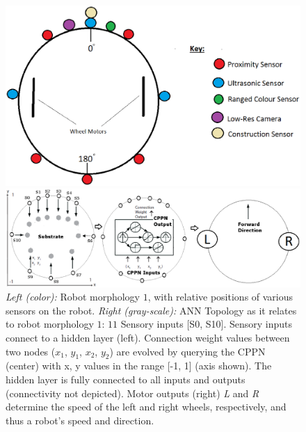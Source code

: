\documentclass[conference]{IEEEtran}
\begin{document}
\begin{figure}[t]
    \centering
    \begin{minipage}{0.39\textwidth}
       	\centering
        \includegraphics[width=\textwidth]{Morphology.eps}
    \end{minipage}
    \centering
    \begin{minipage}{0.60\textwidth}
       	\centering
        \includegraphics[width=\textwidth]{ANN_Config3.eps}
    \end{minipage}
    \caption{\textit{Left (color):} Robot morphology $1$, with relative positions of various sensors on the robot.
    \textit{Right (gray-scale):} ANN Topology as it relates to robot morphology $1$: $11$ Sensory inputs [S0, S10].  Sensory inputs connect to a hidden
    layer (left).  Connection weight values between two nodes ($x_{1}$, $y_{1}$, $x_{2}$, $y_{2}$) are evolved by querying the CPPN (center) with x, y
    values in the range [-1, 1] (axis shown).  The hidden layer is fully connected to all inputs and outputs (connectivity not depicted).
    Motor outputs (right)
    \textit{L} and \textit{R} determine the speed of the left and right wheels, respectively, and thus a robot's speed and direction.}\label{fig:ann}
\end{figure}
\end{document}
